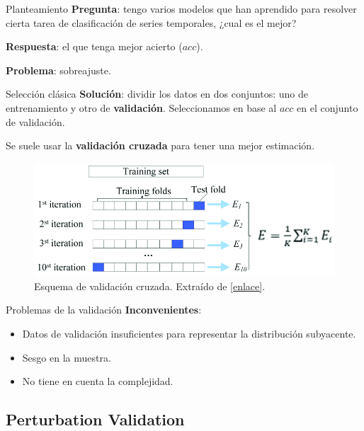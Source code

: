 \documentclass[spanish]{beamer}
\begin{document}
\begin{frame}{Planteamiento}
  \textbf{Pregunta}: tengo varios modelos que han aprendido para resolver cierta tarea de clasificación de series temporales, ¿cual es el mejor?

  \pause

  \textbf{Respuesta}: el que tenga mejor acierto ($acc$).

  \pause

  \textbf{Problema}: sobreajuste.
\end{frame}

\begin{frame}{Selección clásica}
  \textbf{Solución}: dividir los datos en dos conjuntos: uno de entrenamiento y otro de \textbf{validación}. Seleccionamos en base al $acc$ en el conjunto de validación.

  \pause

  Se suele usar la \textbf{validación cruzada} para tener una mejor estimación.

  \begin{figure}
    \centering
    \includegraphics[width=.8 \textwidth]{img/cv}
    \caption{Esquema de validación cruzada. Extraído de \href{https://www.semanticscholar.org/paper/RFAmyloid\%3A-A-Web-Server-for-Predicting-Amyloid-Niu-Li/bf91ead8b0d49922dab952aa7f96e1480578289c/figure/6}{[enlace]}.}
  \end{figure}
\end{frame}

\begin{frame}{Problemas de la validación}
  \textbf{Inconvenientes}:
  \begin{itemize}
    \item Datos de validación insuficientes para representar la distribución subyacente.
    \item Sesgo en la muestra.
    \item No tiene en cuenta la complejidad.
  \end{itemize}
\end{frame}

\subsection{Perturbation Validation}
\end{document}
